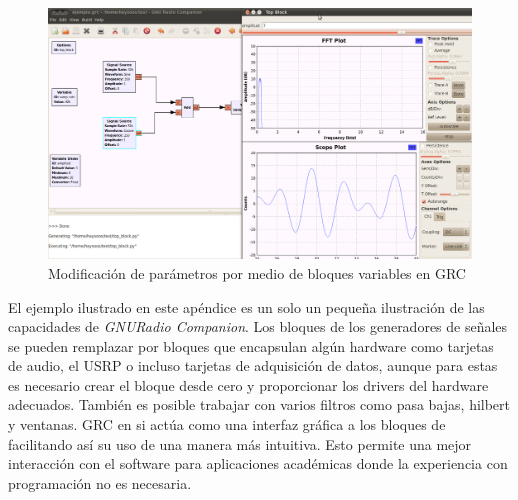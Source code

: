 \begin{figure}[htp]
  \centering
  \includegraphics[width=5.5in]{figs/grc9}
  \vspace{0.3in}
  \caption{Modificaci\'on de par\'ametros por medio de bloques variables en GRC}
  \label{fig:vargrc}
\end{figure}

El ejemplo ilustrado en este ap\'endice es un solo un peque\~na ilustraci\'on de las capacidades de
\emph{GNURadio Companion}. Los bloques de los generadores de se\~nales se pueden remplazar por
bloques que encapsulan alg\'un hardware como tarjetas de audio, el USRP o incluso tarjetas de
adquisici\'on de datos, aunque para estas es necesario crear el bloque desde cero y proporcionar los
drivers del hardware adecuados. Tambi\'en es posible trabajar con varios filtros como pasa bajas,
hilbert y ventanas. GRC en si act\'ua como una interfaz gr\'afica a los bloques de \gnuradio
facilitando as\'i su uso de una manera m\'as intuitiva. Esto permite una mejor interacci\'on con el
software para aplicaciones acad\'emicas donde la experiencia con programaci\'on no es necesaria.
